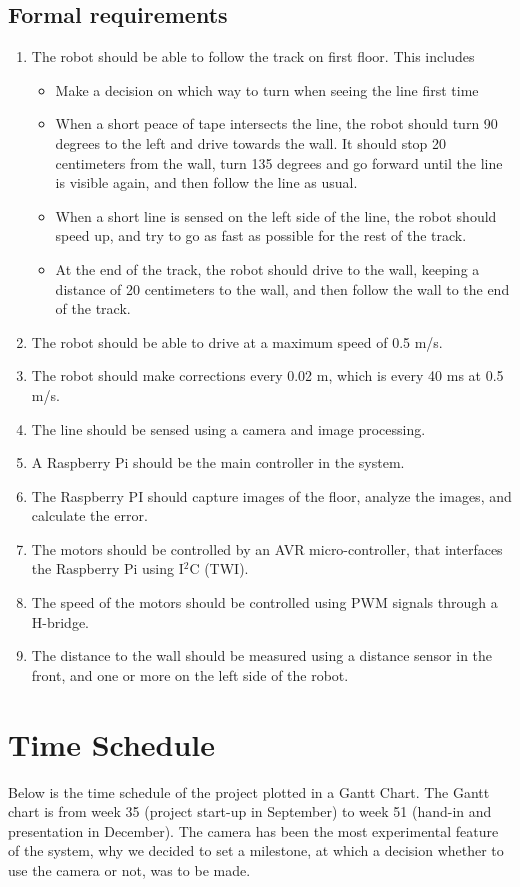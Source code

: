 \subsection{Formal requirements}
\begin{enumerate}
	\item The robot should be able to follow the track on first floor. This includes 
	\begin{itemize}
		\item Make a decision on which way to turn when seeing the line first time 
		\item When a short peace of tape intersects the line, the robot should turn 90 degrees to the left
		and drive towards the wall. It should stop 20 centimeters from the wall, turn 135 degrees
		and go forward until the line is visible again, and then follow the line as usual.
		\item When a short line is sensed on the left side of the line, the robot should speed up, and try to go as fast as possible for the rest of the track.
		\item At the end of the track, the robot should drive to the wall, keeping a distance of 20
		centimeters to the wall, and then follow the wall to the end of the track.
	\end{itemize}
	\item The robot should be able to drive at a maximum speed of 0.5 m/s.
	\item The robot should make corrections every 0.02 m, which is every 40 ms at 0.5 m/s.
	\item The line should be sensed using a camera and image processing.
	\item A Raspberry Pi should be the main controller in the system.
	\item The Raspberry PI should capture images of the floor, analyze the images, and calculate the error.
	\item The motors should be controlled by an AVR micro-controller, that interfaces the Raspberry Pi
	using I$^2$C (TWI).
	\item The speed of the motors should be controlled using PWM signals through a H-bridge.
	\item The distance to the wall should be measured using a distance sensor in the front, and one or more on the
	left side of the robot.
\end{enumerate}

\section{Time Schedule}
Below is the time schedule of the project plotted in a Gantt Chart. The Gantt chart is from week 35 (project start-up in September) to week 51 (hand-in and presentation in December). The camera has been the most experimental feature of the system, why we decided to set a milestone, at which a decision whether to use the camera or not, was to be made.\\

